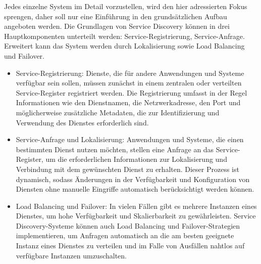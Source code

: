 Jedes einzelne System im Detail vorzustellen, wird den hier adressierten Fokus sprengen, daher soll nur eine Einführung in den grundsätzlichen Aufbau angeboten werden. 
Die Grundlagen von Service Discovery können in drei Hauptkomponenten unterteilt werden: Service-Registrierung, Service-Anfrage. Erweitert kann das System werden durch Lokalisierung sowie Load Balancing und Failover.
\begin{itemize}
\item Service-Registrierung: Dienste, die für andere Anwendungen und Systeme verfügbar sein sollen, müssen zunächst in einem zentralen oder verteilten Service-Register registriert werden. Die Registrierung umfasst in der Regel Informationen wie den Dienstnamen, die Netzwerkadresse, den Port und möglicherweise zusätzliche Metadaten, die zur Identifizierung und Verwendung des Dienstes erforderlich sind.
\item Service-Anfrage und Lokalisierung: Anwendungen und Systeme, die einen bestimmten Dienst nutzen möchten, stellen eine Anfrage an das Service-Register, um die erforderlichen Informationen zur Lokalisierung und Verbindung mit dem gewünschten Dienst zu erhalten. Dieser Prozess ist dynamisch, sodass Änderungen in der Verfügbarkeit und Konfiguration von Diensten ohne manuelle Eingriffe automatisch berücksichtigt werden können.
\item Load Balancing und Failover: In vielen Fällen gibt es mehrere Instanzen eines Dienstes, um hohe Verfügbarkeit und Skalierbarkeit zu gewährleisten. Service Discovery-Systeme können auch Load Balancing und Failover-Strategien implementieren, um Anfragen automatisch an die am besten geeignete Instanz eines Dienstes zu verteilen und im Falle von Ausfällen nahtlos auf verfügbare Instanzen umzuschalten.
\end{itemize}    

